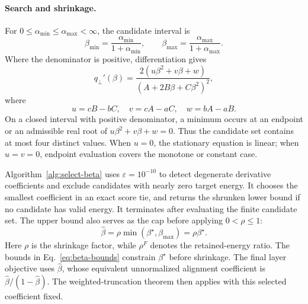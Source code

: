 \paragraph{Search and shrinkage.}
For $0\le\alpha_{\min}\le\alpha_{\max}<\infty$, the candidate interval is
\begin{equation}
\beta_{\min}=\frac{\alpha_{\min}}{1+\alpha_{\min}},\qquad
\beta_{\max}=\frac{\alpha_{\max}}{1+\alpha_{\max}}.
\label{eq:beta-bounds}
\end{equation}
Where the denominator is positive, differentiation gives
\begin{equation}
q_\perp'(\beta)=\frac{2(u\beta^2+v\beta+w)}
{(A+2B\beta+C\beta^2)^2},
\label{eq:beta-derivative}
\end{equation}
where
\begin{equation}
u=cB-bC,\quad v=cA-aC,\quad w=bA-aB.
\label{eq:beta-stationary-coefficients}
\end{equation}
On a closed interval with positive denominator, a minimum occurs at an endpoint or an admissible real root of $u\beta^2+v\beta+w=0$. Thus the candidate set contains at most four distinct values. When $u=0$, the stationary equation is linear; when $u=v=0$, endpoint evaluation covers the monotone or constant case.

Algorithm~\ref{alg:select-beta} uses $\varepsilon=10^{-10}$ to detect degenerate derivative coefficients and exclude candidates with nearly zero target energy. It chooses the smallest coefficient in an exact score tie, and returns the shrunken lower bound if no candidate has valid energy. It terminates after evaluating the finite candidate set. The upper bound also serves as the cap before applying $0<\rho\le1$:
\begin{equation}
\widehat\beta=\rho\min(\beta^\star,\beta_{\max})
=\rho\beta^\star.
\label{eq:beta-shrinkage}
\end{equation}
Here $\rho$ is the shrinkage factor, while $\rho^F$ denotes the retained-energy ratio. The bounds in Eq.~\eqref{eq:beta-bounds} constrain $\beta^\star$ before shrinkage. The final layer objective uses $\widehat\beta$, whose equivalent unnormalized alignment coefficient is $\widehat\beta/(1-\widehat\beta)$. The weighted-truncation theorem then applies with this selected coefficient fixed.

